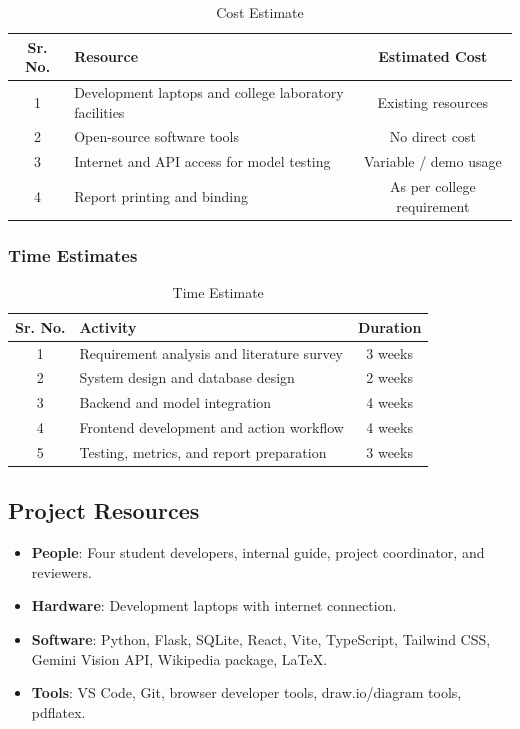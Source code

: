 \begin{table}[H]
\centering
\caption{Cost Estimate}
\begin{tabularx}{\textwidth}{|c|X|c|}
\hline
\textbf{Sr. No.} & \textbf{Resource} & \textbf{Estimated Cost} \\ \hline
1 & Development laptops and college laboratory facilities & Existing resources \\ \hline
2 & Open-source software tools & No direct cost \\ \hline
3 & Internet and API access for model testing & Variable / demo usage \\ \hline
4 & Report printing and binding & As per college requirement \\ \hline
\end{tabularx}
\end{table}

\subsubsection{Time Estimates}
\begin{table}[H]
\centering
\caption{Time Estimate}
\begin{tabularx}{\textwidth}{|c|X|c|}
\hline
\textbf{Sr. No.} & \textbf{Activity} & \textbf{Duration} \\ \hline
1 & Requirement analysis and literature survey & 3 weeks \\ \hline
2 & System design and database design & 2 weeks \\ \hline
3 & Backend and model integration & 4 weeks \\ \hline
4 & Frontend development and action workflow & 4 weeks \\ \hline
5 & Testing, metrics, and report preparation & 3 weeks \\ \hline
\end{tabularx}
\end{table}

\subsection{Project Resources}
\begin{itemize}
\item \textbf{People}: Four student developers, internal guide, project coordinator, and reviewers.
\item \textbf{Hardware}: Development laptops with internet connection.
\item \textbf{Software}: Python, Flask, SQLite, React, Vite, TypeScript, Tailwind CSS, Gemini Vision API, Wikipedia package, LaTeX.
\item \textbf{Tools}: VS Code, Git, browser developer tools, draw.io/diagram tools, pdflatex.
\end{itemize}

